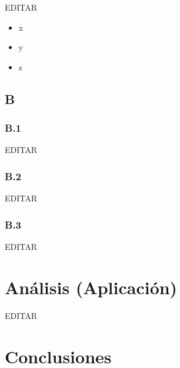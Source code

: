 \documentclass[preprint,12pt]{elsarticle}
\begin{document}
EDITAR

\begin{itemize}

\item x
\item y
\item z

\end{itemize}


\subsection{\textbf{B}}

\subsubsection{\textbf{B.1}}

EDITAR

\subsubsection{\textbf{B.2}}	

EDITAR

\subsubsection{\textbf{B.3}}	

EDITAR





\section{Análisis (Aplicación)}

EDITAR




\section{Conclusiones}
\end{document}
